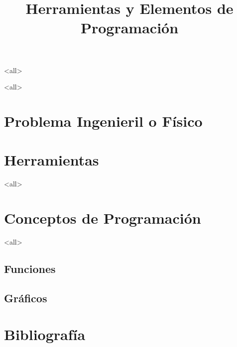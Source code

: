 \mode<all>









\title{
    Herramientas y Elementos de Programación}
\subject{Introducción a la Materia. Repaso de elementos de Programación.}





\mode<all>

\section{Problema Ingenieril o Físico}



\section{Herramientas}



\mode<all>
\section{Conceptos de Programación}


\mode<all>



\subsection{Funciones}

\subsection{Gráficos}

\section{Bibliografía}


